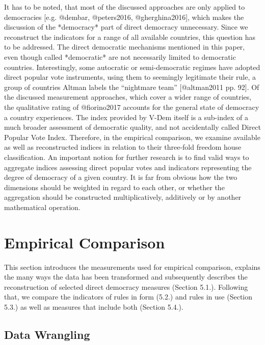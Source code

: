 \documentclass{systats}
\begin{document}
It has to be noted, that most of the discussed approaches are only applied to democracies [e.g. @dembar, @peters2016, @gherghina2016], which makes the discussion of the *democracy* part of direct democracy unnecessary. Since we reconstruct the indicators for a range of all available countries, this question has to be addressed. The direct democratic mechanisms mentioned in this paper, even though called *democratic* are not necessarily limited to democratic countries. Interestingly, some autocratic or semi-democratic regimes have adopted direct popular vote instruments, using them to seemingly legitimate their rule, a group of countries Altman labels the “nightmare team” [@altman2011 pp. 92]. Of the discussed measurement approaches, which cover a wider range of countries, the qualitative rating of @fiorino2017 accounts for the general state of democracy a country experiences. The index provided by V-Dem itself is a sub-index of a much broader assessment of democratic quality, and not accidentally called Direct Popular Vote Index. Therefore, in the empirical comparison, we examine available as well as reconstructed indices in relation to their three-fold freedom house classification. An important notion for further research is to find valid ways to aggregate indices assessing direct popular votes and indicators representing the degree of democracy of a given country. It is far from obvious how the two dimensions should be weighted in regard to each other, or whether the aggregation should be constructed multiplicatively, additively or by another mathematical operation.


\newpage
\section{Empirical Comparison} \label{empiric}


This section introduces the measurements used for empirical comparison, explains the many ways the data has been transformed and subsequently describes the reconstruction of selected direct democracy measures (Section 5.1.). Following that, we compare the indicators of rules in form (5.2.) and rules in use (Section 5.3.) as well as measures that include both (Section 5.4.).   

\subsection{Data Wrangling}
\end{document}
